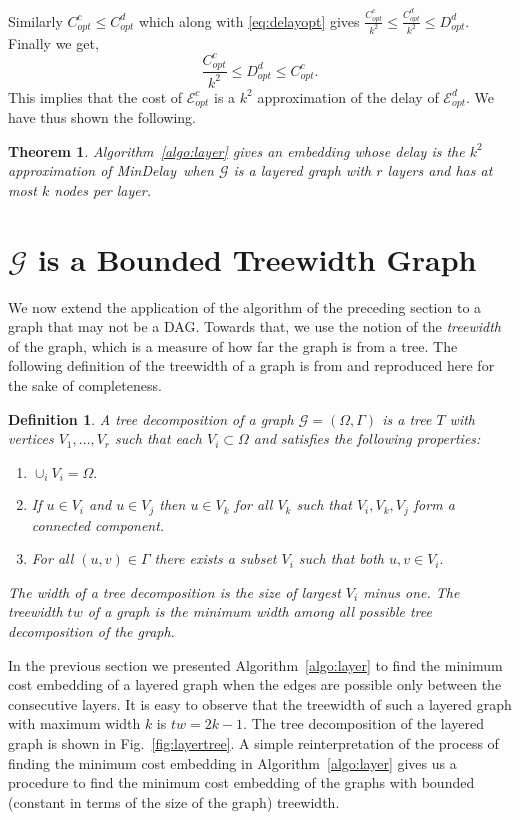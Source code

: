 \documentclass[journal]{IEEEtran}
\newtheorem{theorem}{{\bf Theorem}}
\newtheorem{definition}{{\bf Definition}}
\newcommand{\compgraph}{\mathcal{G}}
\newcommand{\compnodes}{\Omega}
\newcommand{\compedges}{\Gamma}
\newcommand{\mindelay}{\textsf{MinDelay}}
\newcommand{\embedding}{\mathcal{E}}
\begin{document}
Similarly $C_{opt}^{c} \leq C_{opt}^{d}$ which along with
\eqref{eq:delayopt} gives $\frac{C_{opt}^{c}}{k^2} \leq \frac{C_{opt}^{d}}{k^2} \leq D_{opt}^{d}.$
Finally we get,
\begin{equation}
  \frac{C_{opt}^{c}}{k^2} \leq D_{opt}^{d} \leq C_{opt}^{c}. \label{eq:delaycost}
\end{equation}
This implies that the cost of $\embedding_{opt}^c$ is a $k^2$
approximation of the delay of $\embedding_{opt}^d.$ We have thus shown
the following. 
\begin{theorem}
  Algorithm~\ref{algo:layer} gives an embedding whose delay is the
  $k^2$ approximation of \mindelay\ when $\compgraph$ is a layered
  graph with $r$ layers and has at most $k$ nodes per layer.
\end{theorem}

\section{$\compgraph$ is a Bounded Treewidth Graph}
\label{sec:treewidth}

We now extend the application of the algorithm of the preceding
section to a graph that may not be a DAG. Towards that, we use the
notion of the \textit{treewidth} of the graph, which is a measure of
how far the graph is from a tree. The following definition of the
treewidth of a graph is from \cite{Diestel00} and reproduced here for
the sake of completeness.

\begin{definition}
  A tree decomposition of a graph $\compgraph=(\compnodes,\compedges)$
  is a tree $T$ with vertices $V_1,\ldots,V_r$ such that each $V_i
  \subset \compnodes$ and satisfies the following properties:
\begin{enumerate}
  \item $\cup_i V_i = \compnodes.$
  \item If $u \in V_i$ and $u \in V_j$ then $u \in V_k$ for all $V_k$
    such that $V_i,V_k,V_j$ form a connected component.
  \item For all $(u,v) \in \compedges$ there exists a subset $V_i$
    such that both $u,v \in V_i.$
  \end{enumerate}
The width of a tree decomposition is the size of largest $V_i$ minus
  one. The treewidth $tw$ of a graph is the minimum width among all
  possible tree decomposition of the graph.
\end{definition}


In the previous section we presented Algorithm~\ref{algo:layer} to
find the minimum cost embedding of a layered graph when the edges are
possible only between the consecutive layers. It is easy to observe
that the treewidth of such a layered graph with maximum width $k$ is
$tw = 2k-1.$ The tree decomposition of the layered graph is shown in
Fig.~\ref{fig:layertree}. A simple reinterpretation of the process of
finding the minimum cost embedding in Algorithm~\ref{algo:layer} gives
us a procedure to find the minimum cost embedding of the graphs with
bounded (constant in terms of the size of the graph) treewidth.
\end{document}

